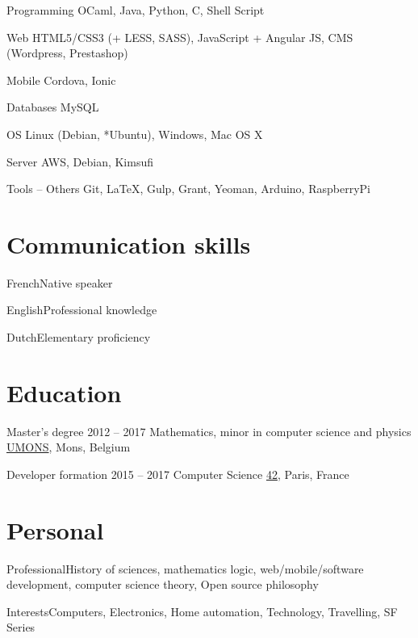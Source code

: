 \documentclass[fontsize=10pt]{tccv}
\begin{document}
\begin{factlist}

\item{Programming}
     {OCaml, Java, Python, C, Shell Script}

\item{Web}
	{HTML5/CSS3 (+ LESS, SASS), JavaScript + Angular JS, CMS (Wordpress,
	Prestashop)}

\item{Mobile}
	{Cordova, Ionic}
\item{Databases}
     {MySQL}

\item{OS}
     {Linux (Debian, *Ubuntu), Windows, Mac OS X}

\item{Server}
     {AWS, Debian, Kimsufi}

\item{Tools -- Others}
     {Git, LaTeX, Gulp, Grant, Yeoman, Arduino, RaspberryPi}
\end{factlist}

\section{Communication skills}

\begin{factlist}
\item{French}{Native speaker}
\item{English}{Professional knowledge}
\item{Dutch}{Elementary proficiency}
\end{factlist}

\section{Education}

\begin{yearlist}

\item[Master's degree]{2012 -- 2017}
     {Mathematics, minor in computer science and physics}
     {\href{http://umons.ac.be}{UMONS}, Mons, Belgium}

\item[Developer formation]{2015 -- 2017}
	 {Computer Science}
	 {\href{http://42.fr}{42}, Paris, France}

\end{yearlist}


\section{Personal}
\begin{factlist}
\item{Professional}{History of sciences,
	mathematics logic, web/mobile/software development, computer science theory,
Open source philosophy}
\item{Interests}{Computers, Electronics, Home automation, Technology,
	Travelling, SF Series}
\end{factlist}
\end{document}
